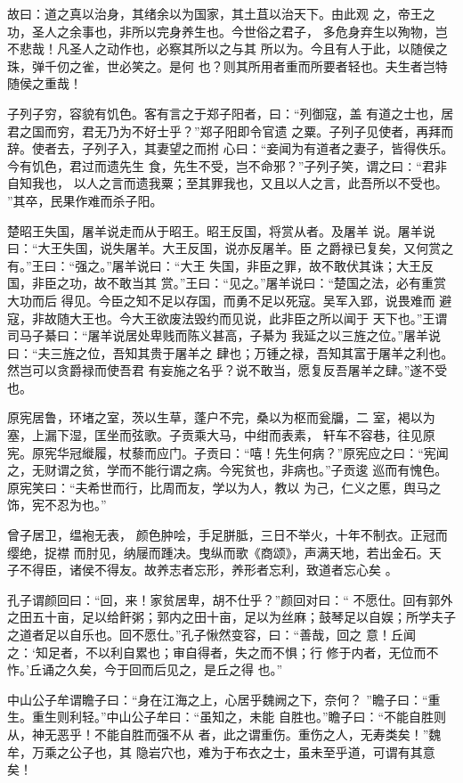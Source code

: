 \documentclass[a4paper,12pt,UTF8,twoside]{ctexbook}
\begin{document}
故曰：道之真以治身，其绪余以为国家，其土苴以治天下。由此观 之，帝王之功，圣人之余事也，非所以完身养生也。今世俗之君子， 多危身弃生以殉物，岂不悲哉！凡圣人之动作也，必察其所以之与其 所以为。今且有人于此，以随侯之珠，弹千仞之雀，世必笑之。是何 也？则其所用者重而所要者轻也。夫生者岂特随侯之重哉！

子列子穷，容貌有饥色。客有言之于郑子阳者，曰：“列御寇，盖 有道之士也，居君之国而穷，君无乃为不好士乎？”郑子阳即令官遗 之粟。子列子见使者，再拜而辞。使者去，子列子入，其妻望之而拊 心曰：“妾闻为有道者之妻子，皆得佚乐。今有饥色，君过而遗先生 食，先生不受，岂不命邪？”子列子笑，谓之曰∶“君非自知我也， 以人之言而遗我粟；至其罪我也，又且以人之言，此吾所以不受也。 ”其卒，民果作难而杀子阳。

楚昭王失国，屠羊说走而从于昭王。昭王反国，将赏从者。及屠羊 说。屠羊说曰：“大王失国，说失屠羊。大王反国，说亦反屠羊。臣 之爵禄已复矣，又何赏之有。”王曰：“强之。”屠羊说曰：“大王 失国，非臣之罪，故不敢伏其诛；大王反国，非臣之功，故不敢当其 赏。”王曰：“见之。”屠羊说曰：“楚国之法，必有重赏大功而后 得见。今臣之知不足以存国，而勇不足以死寇。吴军入郢，说畏难而 避寇，非故随大王也。今大王欲废法毁约而见说，此非臣之所以闻于 天下也。”王谓司马子綦曰：“屠羊说居处卑贱而陈义甚高，子綦为 我延之以三旌之位。”屠羊说曰：“夫三旌之位，吾知其贵于屠羊之 肆也；万锺之禄，吾知其富于屠羊之利也。然岂可以贪爵禄而使吾君 有妄施之名乎？说不敢当，愿复反吾屠羊之肆。”遂不受也。

原宪居鲁，环堵之室，茨以生草，蓬户不完，桑以为枢而瓮牖，二 室，褐以为塞，上漏下湿，匡坐而弦歌。子贡乘大马，中绀而表素， 轩车不容巷，往见原宪。原宪华冠縰履，杖藜而应门。子贡曰：“嘻！先生何病？”原宪应之曰：“宪闻 之，无财谓之贫，学而不能行谓之病。今宪贫也，非病也。”子贡逡 巡而有愧色。原宪笑曰：“夫希世而行，比周而友，学以为人，教以 为己，仁义之慝，舆马之饰，宪不忍为也。”

曾子居卫，缊袍无表， 颜色肿哙，手足胼胝，三日不举火，十年不制衣。正冠而缨绝，捉襟 而肘见，纳屦而踵决。曳纵而歌《商颂》，声满天地，若出金石。天 子不得臣，诸侯不得友。故养志者忘形，养形者忘利，致道者忘心矣 。

孔子谓颜回曰：“回，来！家贫居卑，胡不仕乎？”颜回对曰：“ 不愿仕。回有郭外之田五十亩，足以给飦粥；郭内之田十亩，足以为丝麻；鼓琴足以自娱；所学夫子 之道者足以自乐也。回不愿仕。”孔子愀然变容，曰：“善哉，回之 意！丘闻之：‘知足者，不以利自累也；审自得者，失之而不惧；行 修于内者，无位而不怍。’丘诵之久矣，今于回而后见之，是丘之得 也。”

中山公子牟谓瞻子曰：“身在江海之上，心居乎魏阙之下，奈何？ ”瞻子曰：“重生。重生则利轻。”中山公子牟曰：“虽知之，未能 自胜也。”瞻子曰：“不能自胜则从，神无恶乎！不能自胜而强不从 者，此之谓重伤。重伤之人，无寿类矣！”魏牟，万乘之公子也，其 隐岩穴也，难为于布衣之士，虽未至乎道，可谓有其意矣！
\end{document}
